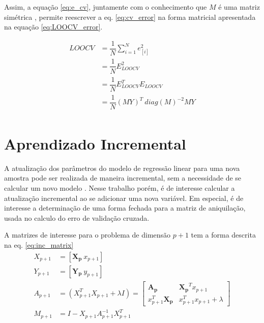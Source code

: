 Assim, a equação \ref{eq:e_cv}, juntamente com o conhecimento que $M$ é uma matriz simétrica \cite{stats_models}, permite reescrever a eq. \ref{eq:cv_error} na forma matricial apresentada na equação \ref{eq:LOOCV_error}.

\begin{equation}
    \begin{split}
        LOOCV   &= \dfrac{1}{N} \sum_{i=1}^{N}e^2_{[i]} \\
                &= \dfrac{1}{N} E_{LOOCV}^2 \\
                &= \dfrac{1}{N}E_{LOOCV}^TE_{LOOCV} \\
                &= \dfrac{1}{N} (MY)^T\ diag(M)^{-2}MY \\
    \end{split}
    \label{eq:LOOCV_error}
\end{equation}

\section{Aprendizado Incremental}

A atualização dos parâmetros do modelo de regressão linear para uma nova amostra pode ser realizada de maneira 
incremental, sem a necessidade de se calcular um novo modelo \cite{mit_onlinereg}. Nesse trabalho porém, é de 
interesse calcular a atualização incremental ao se adicionar uma nova variável. Em especial, é de 
interesse a determinação de uma forma fechada para a matriz de aniquilação, usada no calculo do erro de 
validação cruzada.

A matrizes de interesse para o problema de dimensão $p+1$ tem a forma descrita na eq. \ref{eq:inc_matrix} 
\begin{equation}
    \begin{split}
    X_{p+1} &= \left[\mathbf{X_p}\ x_{p+1}\right] \\
    Y_{p+1} &= \left[\mathbf{Y_p}\ y_{p+1}\right] \\
    A_{p+1} &= (X_{p+1}^T X_{p+1} + \lambda I ) = 
    \begin{bmatrix}
        \mathbf{A_p} & \mathbf{X_p}^T x_{p+1} \\
        x_{p+1}^T \mathbf{X_p} & x_{p+1}^T x_{p+1} + \lambda
    \end{bmatrix}  \\
    M_{p+1} &= I - X_{p+1} A_{p+1}^{-1} X_{p+1}^T \\ 
    \end{split}  
    \label{eq:inc_matrix}
\end{equation}

